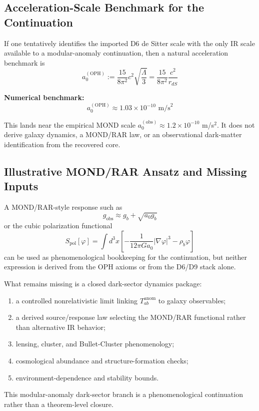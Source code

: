 \subsection{Acceleration-Scale Benchmark for the Continuation}\label{94-the-mond-acceleration-scale}

If one tentatively identifies the imported D6 de Sitter scale with the only IR scale available to a modular-anomaly continuation, then a natural acceleration benchmark is \[a_0^{(\text{OPH})} := \frac{15}{8\pi^2} c^2 \sqrt{\frac{\Lambda}{3}} = \frac{15}{8\pi^2} \frac{c^2}{r_{dS}}\]

\textbf{Numerical benchmark:} \[a_0^{(\text{OPH})} \approx 1.03 \times 10^{-10} \text{ m/s}^2\]

This lands near the empirical MOND scale \(a_0^{(\text{obs})} \approx 1.2 \times 10^{-10}\) m/s\(^2\). It does not derive galaxy dynamics, a MOND/RAR law, or an observational dark-matter identification from the recovered core.

\subsection{Illustrative MOND/RAR Ansatz and Missing Inputs}\label{95-polarization-response-mond-like-scaling}

A MOND/RAR-style response such as \[g_{\text{obs}} \approx g_b + \sqrt{a_0 g_b}\]
or the cubic polarization functional \[S_{\text{pol}}[\varphi] = \int d^3x \left[-\frac{1}{12\pi G a_0}|\nabla\varphi|^3 - \rho_b \varphi\right]\]
can be used as phenomenological bookkeeping for the continuation, but neither expression is derived from the OPH axioms or from the D6/D9 stack alone.

What remains missing is a closed dark-sector dynamics package:
\begin{enumerate}
\item a controlled nonrelativistic limit linking \(T_{ab}^{\text{anom}}\) to galaxy observables;
\item a derived source/response law selecting the MOND/RAR functional rather than alternative IR behavior;
\item lensing, cluster, and Bullet-Cluster phenomenology;
\item cosmological abundance and structure-formation checks;
\item environment-dependence and stability bounds.
\end{enumerate}

This modular-anomaly dark-sector branch is a phenomenological continuation rather than a theorem-level closure.

